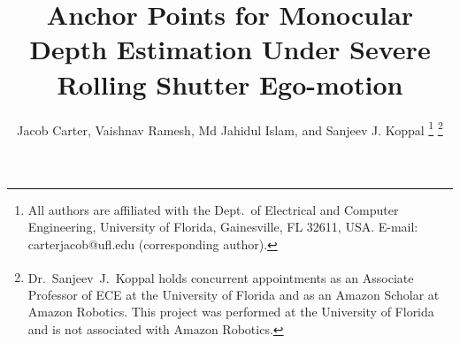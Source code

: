 \documentclass[conference]{IEEEtran}
\author{Jacob Carter, Vaishnav Ramesh, Md Jahidul Islam, and Sanjeev J. Koppal\textsuperscript{\textdagger}%
\thanks{All authors are affiliated with the Dept.~of Electrical and Computer Engineering, University of Florida, Gainesville, FL 32611, USA.
E-mail: carterjacob@ufl.edu (corresponding author).}
\thanks{\textsuperscript{\textdagger}
Dr.~Sanjeev~J.~Koppal holds concurrent appointments as an Associate Professor of ECE at the University of Florida and as an Amazon Scholar at Amazon Robotics. This project was performed at the University of Florida and is not associated with Amazon Robotics.}%
%
}
\begin{document}
\title{\vspace{5mm}Anchor Points for Monocular Depth Estimation Under Severe Rolling Shutter Ego-motion%
}




%     


\maketitle 

\begin{figure}
    
\end{figure}






















\end{document}
